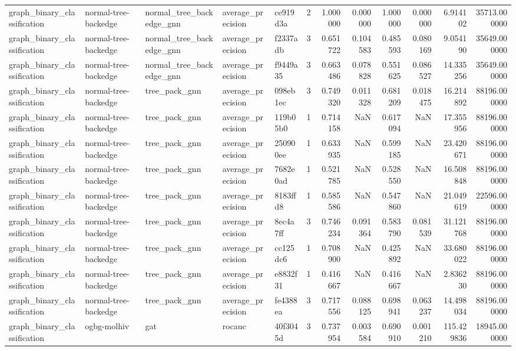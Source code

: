 \begin{tabular}{lllllrrrrrrr}
graph_binary_classification & normal-tree-backedge & normal_tree_backedge_gnn & average_precision & ce919d3a & 2 & 1.000000 & 0.000000 & 1.000000 & 0.000000 & 6.914102 & 35713.000000 \\
graph_binary_classification & normal-tree-backedge & normal_tree_backedge_gnn & average_precision & f2337adb & 3 & 0.651722 & 0.104583 & 0.485593 & 0.080169 & 9.054190 & 35649.000000 \\
graph_binary_classification & normal-tree-backedge & normal_tree_backedge_gnn & average_precision & f9449a35 & 3 & 0.663486 & 0.078828 & 0.551625 & 0.086527 & 14.335256 & 35649.000000 \\
graph_binary_classification & normal-tree-backedge & tree_pack_gnn & average_precision & 098eb1ec & 3 & 0.749320 & 0.011328 & 0.681209 & 0.018475 & 16.214892 & 88196.000000 \\
graph_binary_classification & normal-tree-backedge & tree_pack_gnn & average_precision & 119b05b0 & 1 & 0.714158 & NaN & 0.617094 & NaN & 17.355956 & 88196.000000 \\
graph_binary_classification & normal-tree-backedge & tree_pack_gnn & average_precision & 250900ee & 1 & 0.633935 & NaN & 0.599185 & NaN & 23.420671 & 88196.000000 \\
graph_binary_classification & normal-tree-backedge & tree_pack_gnn & average_precision & 7682e0ad & 1 & 0.521785 & NaN & 0.528550 & NaN & 16.508848 & 88196.000000 \\
graph_binary_classification & normal-tree-backedge & tree_pack_gnn & average_precision & 8183ffd8 & 1 & 0.585586 & NaN & 0.547860 & NaN & 21.049619 & 22596.000000 \\
graph_binary_classification & normal-tree-backedge & tree_pack_gnn & average_precision & 8ec4a7ff & 3 & 0.746234 & 0.091364 & 0.583790 & 0.081539 & 31.121768 & 88196.000000 \\
graph_binary_classification & normal-tree-backedge & tree_pack_gnn & average_precision & cc125dc6 & 1 & 0.708900 & NaN & 0.425892 & NaN & 33.680022 & 88196.000000 \\
graph_binary_classification & normal-tree-backedge & tree_pack_gnn & average_precision & e8832f31 & 1 & 0.416667 & NaN & 0.416667 & NaN & 2.836230 & 88196.000000 \\
graph_binary_classification & normal-tree-backedge & tree_pack_gnn & average_precision & fe4388ea & 3 & 0.717556 & 0.088125 & 0.698941 & 0.063237 & 14.498034 & 88196.000000 \\
graph_binary_classification & ogbg-molhiv & gat & rocauc & 40f3045d & 3 & 0.737954 & 0.003584 & 0.690910 & 0.001210 & 115.429836 & 18945.000000 \\

\end{tabular}
